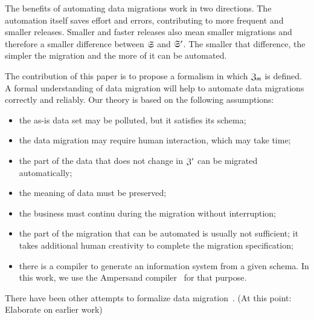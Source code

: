 \documentclass{elsarticle}
\begin{document}
   The benefits of automating data migrations work in two directions.
   The automation itself saves effort and errors,
   contributing to more frequent and smaller releases.
   Smaller and faster releases also mean smaller migrations
   and therefore a smaller difference between $\mathfrak{S}$ and $\mathfrak{S}'$.
   The smaller that difference, the simpler the migration and the more of it can be automated.

   The contribution of this paper is to propose a formalism in which $\mathfrak{Z}_m$ is defined.
   A formal understanding of data migration will help to automate data migrations correctly and reliably.
   Our theory is based on the following assumptions:
\begin{itemize}
   \item the as-is data set may be polluted, but it satisfies its schema;
   \item the data migration may require human interaction, which may take time;
   \item the part of the data that does not change in $\mathfrak{Z}'$ can be migrated automatically;
   \item the meaning of data must be preserved;
   \item the business must continu during the migration without interruption;
   \item the part of the migration that can be automated is usually not sufficient;
         it takes additional human creativity to complete the migration specification;
   \item there is a compiler to generate an information system from a given schema.
         In this work, we use the Ampersand compiler~\cite{Joosten-JLAMP2018} for that purpose.
\end{itemize}

   There have been other attempts to formalize data migration~\cite{Thalheim2013}.
   (At this point: Elaborate on earlier work)
\end{document}
